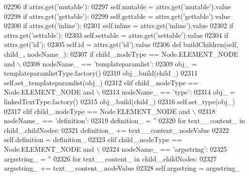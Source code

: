 \begin{DoxyCode}
{{{{{{{{{{{{{{{{{{{{{{{{{{{{{{{{{{{{{{{{{{{{{{{{{{{{{{{{{{{{{{{{{{{{{{{{{{{{{{{{{{{{{{{{{{{{{{{{{{{{{{{{{{{{{{{{{{{{{{{{{{{{{{{{{{{{{{{{{{{{{{{{{{{{{{{{{{{{{{{{{{{{{{{{{{02296         \textcolor{keywordflow}{if} attrs.get(\textcolor{stringliteral}{'mutable'}):
02297             self.mutable = attrs.get(\textcolor{stringliteral}{'mutable'}).value
02298         \textcolor{keywordflow}{if} attrs.get(\textcolor{stringliteral}{'gettable'}):
02299             self.gettable = attrs.get(\textcolor{stringliteral}{'gettable'}).value
02300         \textcolor{keywordflow}{if} attrs.get(\textcolor{stringliteral}{'inline'}):
02301             self.inline = attrs.get(\textcolor{stringliteral}{'inline'}).value
02302         \textcolor{keywordflow}{if} attrs.get(\textcolor{stringliteral}{'settable'}):
02303             self.settable = attrs.get(\textcolor{stringliteral}{'settable'}).value
02304         \textcolor{keywordflow}{if} attrs.get(\textcolor{stringliteral}{'id'}):
02305             self.id = attrs.get(\textcolor{stringliteral}{'id'}).value
02306     \textcolor{keyword}{def }buildChildren(self, child\_, nodeName\_):
02307         \textcolor{keywordflow}{if} child\_.nodeType == Node.ELEMENT\_NODE \textcolor{keywordflow}{and} \(\backslash\)
02308             nodeName\_ == \textcolor{stringliteral}{'templateparamlist'}:
02309             obj\_ = templateparamlistType.factory()
02310             obj\_.build(child\_)
02311             self.set_templateparamlist(obj\_)
02312         \textcolor{keywordflow}{elif} child\_.nodeType == Node.ELEMENT\_NODE \textcolor{keywordflow}{and} \(\backslash\)
02313             nodeName\_ == \textcolor{stringliteral}{'type'}:
02314             obj\_ = linkedTextType.factory()
02315             obj\_.build(child\_)
02316             self.set_type(obj\_)
02317         \textcolor{keywordflow}{elif} child\_.nodeType == Node.ELEMENT\_NODE \textcolor{keywordflow}{and} \(\backslash\)
02318             nodeName\_ == \textcolor{stringliteral}{'definition'}:
02319             definition\_ = \textcolor{stringliteral}{''}
02320             \textcolor{keywordflow}{for} text\_\_content\_ \textcolor{keywordflow}{in} child\_.childNodes:
02321                 definition\_ += text\_\_content\_.nodeValue
02322             self.definition = definition\_
02323         \textcolor{keywordflow}{elif} child\_.nodeType == Node.ELEMENT\_NODE \textcolor{keywordflow}{and} \(\backslash\)
02324             nodeName\_ == \textcolor{stringliteral}{'argsstring'}:
02325             argsstring\_ = \textcolor{stringliteral}{''}
02326             \textcolor{keywordflow}{for} text\_\_content\_ \textcolor{keywordflow}{in} child\_.childNodes:
02327                 argsstring\_ += text\_\_content\_.nodeValue
02328             self.argsstring = argsstring\_
}}}}}}}}}}}}}}}}}}}}}}}}}}}}}}}}}}}}}}}}}}}}}}}}}}}}}}}}}}}}}}}}}}}}}}}}}}}}}}}}}}}}}}}}}}}}}}}}}}}}}}}}}}}}}}}}}}}}}}}}}}}}}}}}}}}}}}}}}}}}}}}}}}}}}}}}}}}}}}}}}}}}}}}}}}
\end{DoxyCode}
